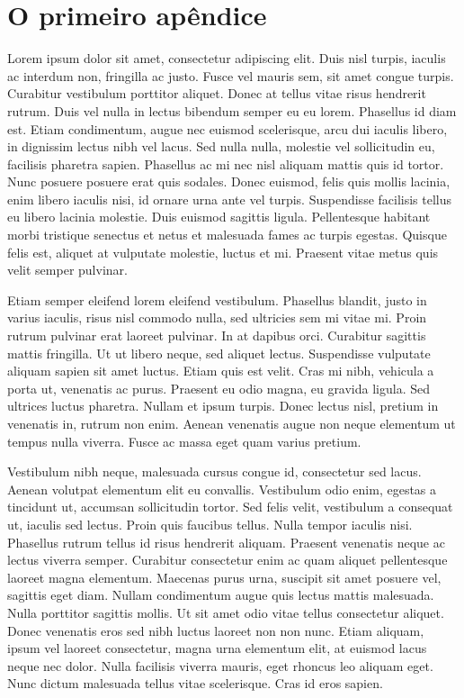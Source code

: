 \chapter{O primeiro apêndice}
\label{app:apendice1}

Lorem ipsum dolor sit amet, consectetur adipiscing elit. Duis nisl turpis, iaculis ac interdum non, fringilla ac justo. Fusce vel mauris sem, sit amet congue turpis. Curabitur vestibulum porttitor aliquet. Donec at tellus vitae risus hendrerit rutrum. Duis vel nulla in lectus bibendum semper eu eu lorem. Phasellus id diam est. Etiam condimentum, augue nec euismod scelerisque, arcu dui iaculis libero, in dignissim lectus nibh vel lacus. Sed nulla nulla, molestie vel sollicitudin eu, facilisis pharetra sapien. Phasellus ac mi nec nisl aliquam mattis quis id tortor. Nunc posuere posuere erat quis sodales. Donec euismod, felis quis mollis lacinia, enim libero iaculis nisi, id ornare urna ante vel turpis. Suspendisse facilisis tellus eu libero lacinia molestie. Duis euismod sagittis ligula. Pellentesque habitant morbi tristique senectus et netus et malesuada fames ac turpis egestas. Quisque felis est, aliquet at vulputate molestie, luctus et mi. Praesent vitae metus quis velit semper pulvinar.

Etiam semper eleifend lorem eleifend vestibulum. Phasellus blandit, justo in varius iaculis, risus nisl commodo nulla, sed ultricies sem mi vitae mi. Proin rutrum pulvinar erat laoreet pulvinar. In at dapibus orci. Curabitur sagittis mattis fringilla. Ut ut libero neque, sed aliquet lectus. Suspendisse vulputate aliquam sapien sit amet luctus. Etiam quis est velit. Cras mi nibh, vehicula a porta ut, venenatis ac purus. Praesent eu odio magna, eu gravida ligula. Sed ultrices luctus pharetra. Nullam et ipsum turpis. Donec lectus nisl, pretium in venenatis in, rutrum non enim. Aenean venenatis augue non neque elementum ut tempus nulla viverra. Fusce ac massa eget quam varius pretium.

Vestibulum nibh neque, malesuada cursus congue id, consectetur sed lacus. Aenean volutpat elementum elit eu convallis. Vestibulum odio enim, egestas a tincidunt ut, accumsan sollicitudin tortor. Sed felis velit, vestibulum a consequat ut, iaculis sed lectus. Proin quis faucibus tellus. Nulla tempor iaculis nisi. Phasellus rutrum tellus id risus hendrerit aliquam. Praesent venenatis neque ac lectus viverra semper. Curabitur consectetur enim ac quam aliquet pellentesque laoreet magna elementum. Maecenas purus urna, suscipit sit amet posuere vel, sagittis eget diam. Nullam condimentum augue quis lectus mattis malesuada. Nulla porttitor sagittis mollis. Ut sit amet odio vitae tellus consectetur aliquet. Donec venenatis eros sed nibh luctus laoreet non non nunc. Etiam aliquam, ipsum vel laoreet consectetur, magna urna elementum elit, at euismod lacus neque nec dolor. Nulla facilisis viverra mauris, eget rhoncus leo aliquam eget. Nunc dictum malesuada tellus vitae scelerisque. Cras id eros sapien.

